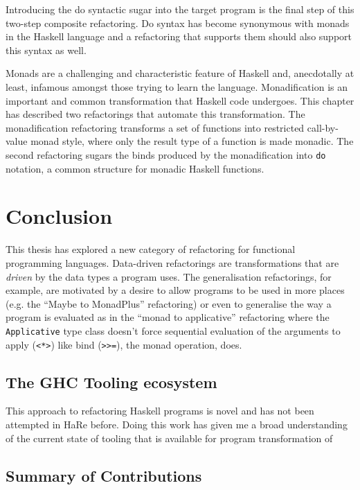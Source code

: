 Introducing the do syntactic sugar into the target program is the final step of this two-step composite refactoring. Do syntax has become synonymous with monads in the Haskell language and a refactoring that supports them should also support this syntax as well.

Monads are a challenging and characteristic feature of Haskell and, anecdotally at least, infamous amongst those trying to learn the language. Monadification is an important and common transformation that Haskell code undergoes. This chapter has described two refactorings that automate this transformation. The monadification refactoring transforms a set of functions into restricted call-by-value monad style, where only the result type of a function is made monadic. The second refactoring sugars the binds produced by the monadification into \texttt{do} notation, a common structure for monadic Haskell functions.

\chapter{Conclusion}
\label{chp:conc}

This thesis has explored a new category of refactoring for functional programming languages. Data-driven refactorings are transformations that are \textit{driven} by the data types a program uses. The generalisation refactorings, for example, are motivated by a desire to allow programs to be used in more places (e.g. the ``Maybe to MonadPlus'' refactoring) or even to generalise the way a program is evaluated as in the ``monad to applicative'' refactoring where the \texttt{Applicative} type class doesn't force sequential evaluation of the arguments to apply (\texttt{<*>}) like bind (\texttt{>>=}), the monad operation, does.

\section{The GHC Tooling ecosystem}

This approach to refactoring Haskell programs is novel and has not been attempted in HaRe before. Doing this work has given me a broad understanding of the current state of tooling that is available for program transformation of 

\section{Summary of Contributions}

